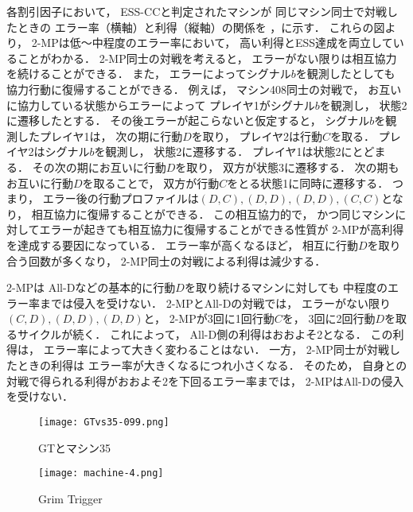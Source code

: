 \documentclass[submit]{ipsj}
\theoremstyle{definition}
\begin{document}
各割引因子において，
ESS-CCと判定されたマシンが
同じマシン同士で対戦したときの
エラー率（横軸）と利得（縦軸）の関係を
，に示す．
これらの図より，
2-MPは低〜中程度のエラー率において，
高い利得とESS達成を両立していることがわかる．
2-MP同士の対戦を考えると，
エラーがない限りは相互協力を続けることができる．
また，
エラーによってシグナル$b$を観測したとしても
協力行動に復帰することができる．
例えば，
マシン408同士の対戦で，
お互いに協力している状態からエラーによって
プレイヤ1がシグナル$b$を観測し，
状態2に遷移したとする．
その後エラーが起こらないと仮定すると，
シグナル$b$を観測したプレイヤ1は，
次の期に行動$D$を取り，
プレイヤ2は行動$C$を取る．
プレイヤ2はシグナル$b$を観測し，
状態2に遷移する．
プレイヤ1は状態2にとどまる．
その次の期にお互いに行動$D$を取り，
双方が状態3に遷移する．
次の期もお互いに行動$D$を取ることで，
双方が行動$C$をとる状態1に同時に遷移する．
つまり，
エラー後の行動プロファイルは$(D, C), (D, D), (D, D), (C, C)$となり，
相互協力に復帰することができる．
この相互協力的で，
かつ同じマシンに対してエラーが起きても相互協力に復帰することができる性質が
2-MPが高利得を達成する要因になっている．
エラー率が高くなるほど，
相互に行動$D$を取り合う回数が多くなり，
2-MP同士の対戦による利得は減少する．

2-MPは
All-Dなどの基本的に行動$D$を取り続けるマシンに対しても
中程度のエラー率までは侵入を受けない．
2-MPとAll-Dの対戦では，
エラーがない限り$(C, D), (D, D), (D, D)$と，
2-MPが3回に1回行動$C$を，
3回に2回行動$D$を取るサイクルが続く．
これによって，
All-D側の利得はおおよそ2となる．
この利得は，
エラー率によって大きく変わることはない．
一方，
2-MP同士が対戦したときの利得は
エラー率が大きくなるにつれ小さくなる．
そのため，
自身との対戦で得られる利得がおおよそ2を下回るエラー率までは，
2-MPはAll-Dの侵入を受けない．

\begin{figure}[tb]
  \centering
  \texttt{[image: GTvs35-099.png]}
  \caption{GTとマシン35}
  \label{fig:GTvs35-099}
\end{figure}
\begin{figure}
  \centering
  \texttt{[image: machine-4.png]}
  \caption{Grim Trigger}
  \label{fig:Grim-Trigger}
\end{figure}
\end{document}
